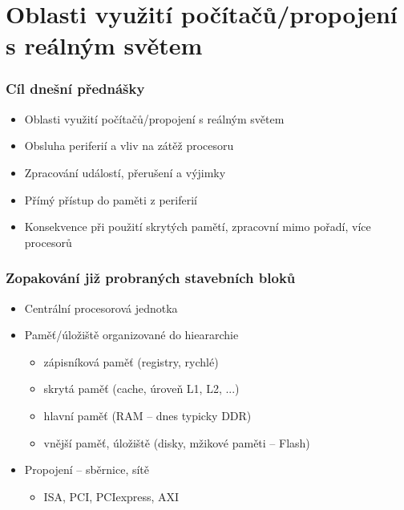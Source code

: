 \documentclass{beamer}
\subtitle{Lekce 09. Přerušení a události}
\author{Pavel Píša \phantom{xxxxxxxxx} Petr Štěpán \\ \small\texttt{pisa@fel.cvut.cz}\phantom{xxxx}\small\texttt{stepan@fel.cvut.cz}}
\begin{document}
\maketitle

\section{Oblasti využití počítačů/propojení s reálným světem}

\begin{frame}
\frametitle{Cíl dnešní přednášky}

\begin{itemize}
 \item Oblasti využití počítačů/propojení s reálným světem
 \item Obsluha periferií a vliv na zátěž procesoru
 \item Zpracování událostí, přerušení a výjimky
 \item Přímý přístup do paměti z periferií
 \item Konsekvence při použití skrytých pamětí, zpracovní mimo pořadí, více procesorů
\end{itemize}
\end{frame}

\begin{frame}
\frametitle{Zopakování již probraných stavebních bloků}

\begin{itemize}
 \item Centrální procesorová jednotka
 \item Paměť/úložiště organizované do hieararchie
 \begin{itemize}
  \item zápisníková paměť (registry, rychlé)
  \item skrytá paměť (cache, úroveň L1, L2, ...)
  \item hlavní paměť (RAM -- dnes typicky DDR)
  \item vnější paměť, úložiště (disky, mžikové paměti -- Flash)
 \end{itemize}
 \item Propojení -- sběrnice, sítě
 \begin{itemize}
  \item ISA, PCI, PCIexpress, AXI
 \end{itemize}
\end{itemize}
\end{frame}
\end{document}
